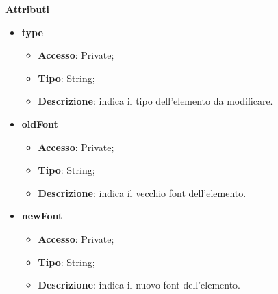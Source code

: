 {{{	\textbf{Attributi}
	\begin{itemize}
		\item \textbf{type}
		\begin{itemize}
			\item \textbf{Accesso}: Private;
			\item \textbf{Tipo}: String;
			\item \textbf{Descrizione}: indica il tipo dell’elemento da modificare.
		\end{itemize}
		\item \textbf{oldFont}
		\begin{itemize}
			\item \textbf{Accesso}: Private;
			\item \textbf{Tipo}: String;
			\item \textbf{Descrizione}: indica il vecchio font dell’elemento.
		\end{itemize}
		\item \textbf{newFont}
		\begin{itemize}
			\item \textbf{Accesso}: Private;
			\item \textbf{Tipo}: String;
			\item \textbf{Descrizione}: indica il nuovo font dell’elemento.
		\end{itemize}
	\end{itemize}
	
}}}
